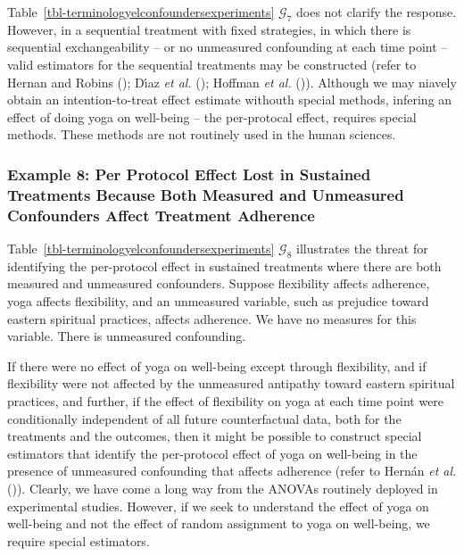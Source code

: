 \documentclass[
  single column]{article}
\begin{document}
Table~\ref{tbl-terminologyelconfoundersexperiments} \(\mathcal{G}_{7}\)
does not clarify the response. However, in a sequential treatment with
fixed strategies, in which there is sequential exchangeability -- or no
unmeasured confounding at each time point -- valid estimators for the
sequential treatments may be constructed (refer to Hernan and Robins
(); Dı́az \emph{et al.}
(); Hoffman \emph{et al.}
()). Although we may niavely obtain an
intention-to-treat effect estimate withouth special methods, infering an
effect of doing yoga on well-being -- the per-protocal effect, requires
special methods. These methods are not routinely used in the human
sciences.

\subsubsection{Example 8: Per Protocol Effect Lost in Sustained
Treatments Because Both Measured and Unmeasured Confounders Affect
Treatment
Adherence}\label{example-8-per-protocol-effect-lost-in-sustained-treatments-because-both-measured-and-unmeasured-confounders-affect-treatment-adherence}

Table~\ref{tbl-terminologyelconfoundersexperiments} \(\mathcal{G}_{8}\)
illustrates the threat for identifying the per-protocol effect in
sustained treatments where there are both measured and unmeasured
confounders. Suppose flexibility affects adherence, yoga affects
flexibility, and an unmeasured variable, such as prejudice toward
eastern spiritual practices, affects adherence. We have no measures for
this variable. There is unmeasured confounding.

If there were no effect of yoga on well-being except through
flexibility, and if flexibility were not affected by the unmeasured
antipathy toward eastern spiritual practices, and further, if the effect
of flexibility on yoga at each time point were conditionally independent
of all future counterfactual data, both for the treatments and the
outcomes, then it might be possible to construct special estimators that
identify the per-protocol effect of yoga on well-being in the presence
of unmeasured confounding that affects adherence (refer to Hernán
\emph{et al.} ()). Clearly, we have
come a long way from the ANOVAs routinely deployed in experimental
studies. However, if we seek to understand the effect of yoga on
well-being and not the effect of random assignment to yoga on
well-being, we require special estimators.
\end{document}
